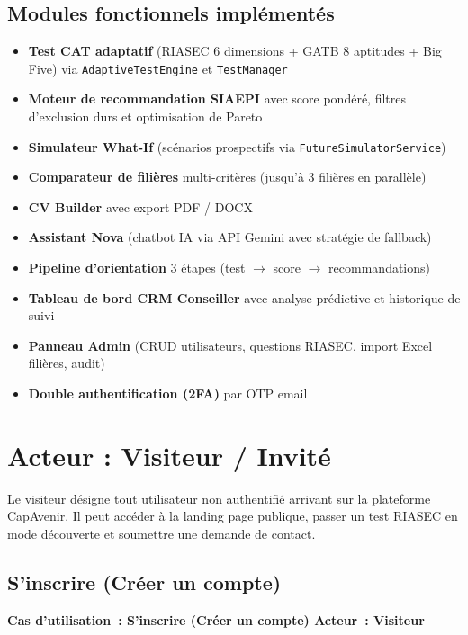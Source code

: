 \documentclass[a4paper,12pt]{article}
\newcommand{\ucheader}[2]{%
  \noindent\colorbox{capblue}{\parbox{\dimexpr\linewidth-2\fboxsep}{%
    \color{white}\bfseries\large Cas d'utilisation~: #1 \hfill \normalsize Acteur~: #2
  }}\\[2pt]
}
\begin{document}
\subsection*{Modules fonctionnels implémentés}
\begin{itemize}
  \item \textbf{Test CAT adaptatif} (RIASEC 6 dimensions + GATB 8 aptitudes + Big Five) via \texttt{AdaptiveTestEngine} et \texttt{TestManager}
  \item \textbf{Moteur de recommandation SIAEPI} avec score pondéré, filtres d'exclusion durs et optimisation de Pareto
  \item \textbf{Simulateur What-If} (scénarios prospectifs via \texttt{FutureSimulatorService})
  \item \textbf{Comparateur de filières} multi-critères (jusqu'à 3 filières en parallèle)
  \item \textbf{CV Builder} avec export PDF / DOCX
  \item \textbf{Assistant Nova} (chatbot IA via API Gemini avec stratégie de fallback)
  \item \textbf{Pipeline d'orientation} 3 étapes (test $\rightarrow$ score $\rightarrow$ recommandations)
  \item \textbf{Tableau de bord CRM Conseiller} avec analyse prédictive et historique de suivi
  \item \textbf{Panneau Admin} (CRUD utilisateurs, questions RIASEC, import Excel filières, audit)
  \item \textbf{Double authentification (2FA)} par OTP email
\end{itemize}

\newpage

\section{Acteur : Visiteur / Invité}

Le visiteur désigne tout utilisateur non authentifié arrivant sur la plateforme CapAvenir. Il peut accéder à la landing page publique, passer un test RIASEC en mode découverte et soumettre une demande de contact.

\subsection{S'inscrire (Créer un compte)}
\ucheader{S'inscrire (Créer un compte)}{Visiteur}
\end{document}
